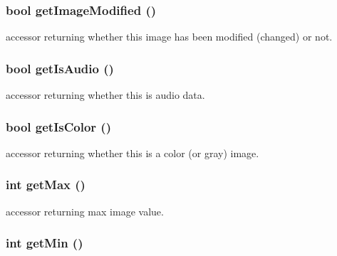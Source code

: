 \subsubsection{\setlength{\rightskip}{0pt plus 5cm}bool get\-Image\-Modified ()}\label{class_c_s_image_viewer_1_1_image_data_68c87c6f22371f3afa7e5e55edf80148}


accessor returning whether this image has been modified (changed) or not. 

\subsubsection{\setlength{\rightskip}{0pt plus 5cm}bool get\-Is\-Audio ()}\label{class_c_s_image_viewer_1_1_image_data_54e153862be2c0c9d98dbae8ff5815c6}


accessor returning whether this is audio data. 

\subsubsection{\setlength{\rightskip}{0pt plus 5cm}bool get\-Is\-Color ()}\label{class_c_s_image_viewer_1_1_image_data_f1e4c902ded334322ec78572ebfedc90}


accessor returning whether this is a color (or gray) image. 

\subsubsection{\setlength{\rightskip}{0pt plus 5cm}int get\-Max ()}\label{class_c_s_image_viewer_1_1_image_data_12b2f50470d2cc288a8fe7ba0a5556b2}


accessor returning max image value. 

\subsubsection{\setlength{\rightskip}{0pt plus 5cm}int get\-Min ()}\label{class_c_s_image_viewer_1_1_image_data_51f5173282f478ea52841f6d8a77312b}


